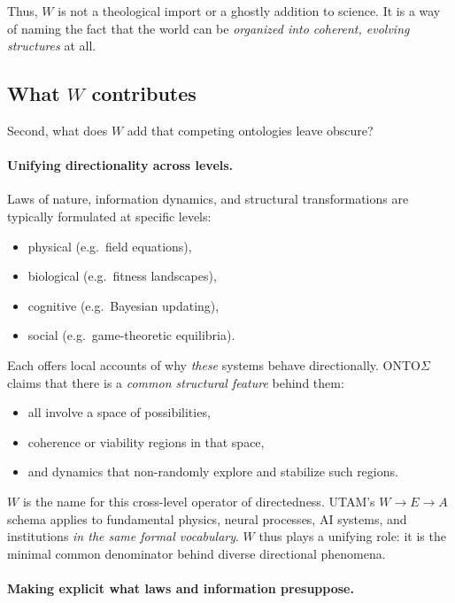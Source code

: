 \documentclass[12pt,a4paper]{report}
\newcommand{\Will}{W}
\newcommand{\Struct}{E}
\newcommand{\Act}{A}
\begin{document}
Thus, \(\Will\) is not a theological import or a ghostly addition to science. It is a way of naming the fact that the world can be \emph{organized into coherent, evolving structures} at all.

\subsection*{What \texorpdfstring{$W$}{W} contributes}

Second, what does \(\Will\) add that competing ontologies leave obscure?

\paragraph{Unifying directionality across levels.}

Laws of nature, information dynamics, and structural transformations are typically formulated at specific levels:

\begin{itemize}[leftmargin=2em]
    \item physical (e.g.\ field equations),
    \item biological (e.g.\ fitness landscapes),
    \item cognitive (e.g.\ Bayesian updating),
    \item social (e.g.\ game-theoretic equilibria).
\end{itemize}

Each offers local accounts of why \emph{these} systems behave directionally. ONTO$\Sigma$ claims that there is a \emph{common structural feature} behind them:

\begin{itemize}[leftmargin=2em]
    \item all involve a space of possibilities,
    \item coherence or viability regions in that space,
    \item and dynamics that non-randomly explore and stabilize such regions.
\end{itemize}

\(\Will\) is the name for this cross-level operator of directedness. UTAM’s \(\Will \to \Struct \to \Act\) schema applies to fundamental physics, neural processes, AI systems, and institutions \emph{in the same formal vocabulary}. \(\Will\) thus plays a unifying role: it is the minimal common denominator behind diverse directional phenomena.

\paragraph{Making explicit what laws and information presuppose.}
\end{document}
